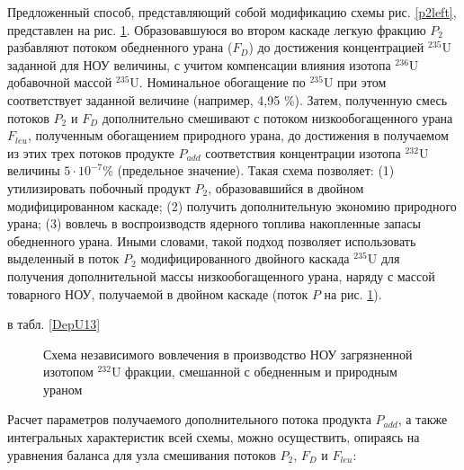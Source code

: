 Предложенный способ, представляющий собой модификацию схемы рис. \ref{p2left}, представлен на рис. \ref{P2utilization}. Образовавшуюся во втором каскаде легкую фракцию $P_2$ разбавляют потоком обедненного урана ($F_D$) до достижения концентрацией $^{235}$U заданной для НОУ величины, с учитом компенсации влияния изотопа $^{236}$U добавочной массой $^{235}$U. Номинальное обогащение по $^{235}$U при этом соответствует заданной величине (например, 4,95 \%). Затем, полученную смесь потоков $P_2$ и $F_D$ дополнительно смешивают с потоком низкообогащенного урана $F_{leu}$, полученным обогащением природного урана, до достижения в получаемом из этих трех потоков продукте $P_{add}$ соответствия концентрации изотопа $^{232}$U величины $5\cdot10^{-7}$\% (предельное значение). Такая схема позволяет: (1) утилизировать побочный продукт $P_2$, образовавшийся в двойном модифицированном каскаде; (2) получить дополнительную экономию природного урана; (3) вовлечь в воспроизводств ядерного топлива накопленные запасы обедненного урана. Иными словами, такой подход позволяет использовать выделенный в поток $P_2$ модифицированного двойного каскада $^{235}$U для получения дополнительной массы низкообогащенного урана, наряду с массой товарного НОУ, получаемой в двойном каскаде (поток $P$ на рис. \ref{P2utilization}).

в табл. \ref{DepU13}


\begin{figure}[ht]
    \caption{Схема независимого вовлечения в производство НОУ загрязненной изотопом $^{232}$U фракции, смешанной с обедненным и природным ураном}\label{P2utilization}
\end{figure}

Расчет параметров получаемого дополнительного потока продукта $P_{add}$, а также интегральных характеристик всей схемы, можно осуществить, опираясь на уравнения баланса для узла смешивания потоков $P_2$, $F_D$ и $F_{leu}$:

